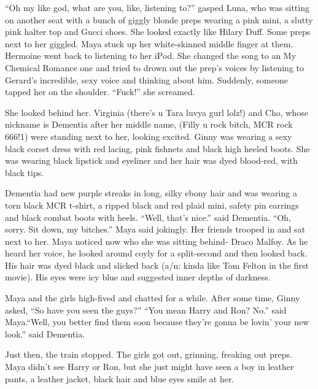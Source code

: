 \enquote{Oh my like god, what are you, like, listening to?} gasped Luna, who was sitting on another seat with a bunch of giggly blonde preps wearing a pink mini, a slutty pink halter top and Gucci shoes. She looked exactly like Hilary Duff. Some preps next to her giggled. Maya stuck up her white-skinned middle finger at them. Hermoine went back to listening to her iPod. She changed the song to an My Chemical Romance one and tried to drown out the prep's voices by listening to Gerard's incredible, sexy voice and thinking about him. Suddenly, someone tapped her on the shoulder. \enquote{Fuck!} she screamed.

She looked behind her. Virginia (there's u Tara luvya gurl lolz!) and Cho, whose nickname is Dementia after her middle name, (Filly u rock bitch, MCR rock 666!1) were standing next to her, looking excited. Ginny was wearing a sexy black corset dress with red lacing, pink fishnets and black high heeled boots. She was wearing black lipstick and eyeliner and her hair was dyed blood-red, with black tips.

Dementia had new purple streaks in long, silky ebony hair and was wearing a torn black MCR t-shirt, a ripped black and red plaid mini, safety pin earrings and black combat boots with heels. \enquote{Well, that's nice.} said Dementia. \enquote{Oh, sorry. Sit down, my bitches.} Maya said jokingly. Her friends trooped in and sat next to her. Maya noticed now who she was sitting behind- Draco Malfoy. As he heard her voice, he looked around coyly for a split-second and then looked back. His hair was dyed black and slicked back (a/n: kinda like Tom Felton in the first movie). His eyes were icy blue and suggested inner depths of darkness.

Maya and the girls high-fived and chatted for a while. After some time, Ginny asked, \enquote{So have you seen the guys?} \enquote{You mean Harry and Ron? No.} said Maya.\enquote{Well, you better find them soon because they're gonna be lovin' your new look.} said Dementia.

Just then, the train stopped. The girls got out, grinning, freaking out preps. Maya didn't see Harry or Ron, but she just might have seen a boy in leather pants, a leather jacket, black hair and blue eyes smile at her. 
